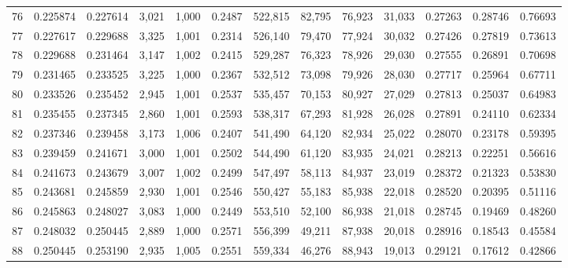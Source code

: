 \begin{tabular}{rrrrrrrrrrrrr}
76  &  0.225874 &  0.227614 &   3,021 &  1,000 &                                     0.2487 &  522,815 &   82,795 &   76,923 &   31,033 &  0.27263 &  0.28746 &  0.76693 \\
77  &  0.227617 &  0.229688 &   3,325 &  1,001 &                                     0.2314 &  526,140 &   79,470 &   77,924 &   30,032 &  0.27426 &  0.27819 &  0.73613 \\
78  &  0.229688 &  0.231464 &   3,147 &  1,002 &                                     0.2415 &  529,287 &   76,323 &   78,926 &   29,030 &  0.27555 &  0.26891 &  0.70698 \\
79  &  0.231465 &  0.233525 &   3,225 &  1,000 &                                     0.2367 &  532,512 &   73,098 &   79,926 &   28,030 &  0.27717 &  0.25964 &  0.67711 \\
80  &  0.233526 &  0.235452 &   2,945 &  1,001 &                                     0.2537 &  535,457 &   70,153 &   80,927 &   27,029 &  0.27813 &  0.25037 &  0.64983 \\
81  &  0.235455 &  0.237345 &   2,860 &  1,001 &                                     0.2593 &  538,317 &   67,293 &   81,928 &   26,028 &  0.27891 &  0.24110 &  0.62334 \\
82  &  0.237346 &  0.239458 &   3,173 &  1,006 &                                     0.2407 &  541,490 &   64,120 &   82,934 &   25,022 &  0.28070 &  0.23178 &  0.59395 \\
83  &  0.239459 &  0.241671 &   3,000 &  1,001 &                                     0.2502 &  544,490 &   61,120 &   83,935 &   24,021 &  0.28213 &  0.22251 &  0.56616 \\
84  &  0.241673 &  0.243679 &   3,007 &  1,002 &                                     0.2499 &  547,497 &   58,113 &   84,937 &   23,019 &  0.28372 &  0.21323 &  0.53830 \\
85  &  0.243681 &  0.245859 &   2,930 &  1,001 &                                     0.2546 &  550,427 &   55,183 &   85,938 &   22,018 &  0.28520 &  0.20395 &  0.51116 \\
86  &  0.245863 &  0.248027 &   3,083 &  1,000 &                                     0.2449 &  553,510 &   52,100 &   86,938 &   21,018 &  0.28745 &  0.19469 &  0.48260 \\
87  &  0.248032 &  0.250445 &   2,889 &  1,000 &                                     0.2571 &  556,399 &   49,211 &   87,938 &   20,018 &  0.28916 &  0.18543 &  0.45584 \\
88  &  0.250445 &  0.253190 &   2,935 &  1,005 &                                     0.2551 &  559,334 &   46,276 &   88,943 &   19,013 &  0.29121 &  0.17612 &  0.42866 \\

\end{tabular}
